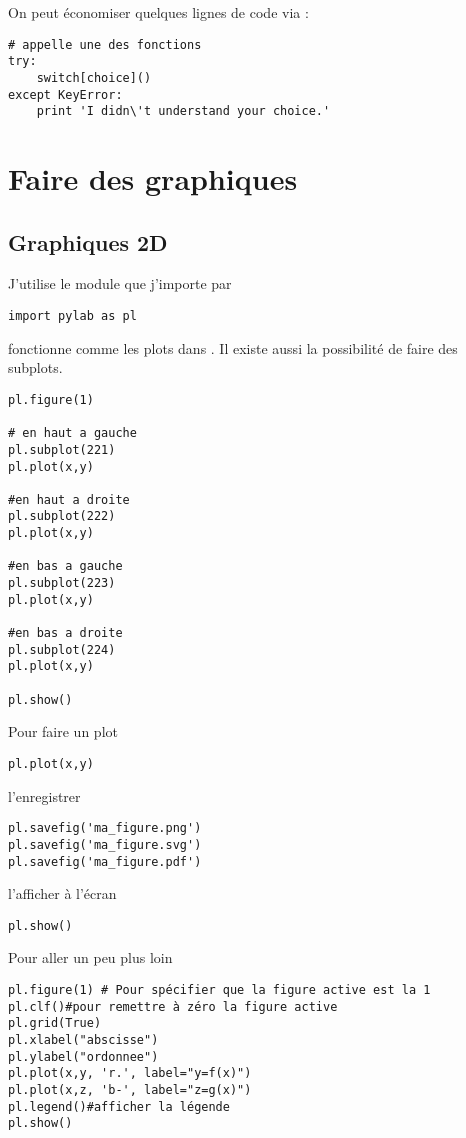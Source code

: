 \documentclass[a4paper,twoside]{article}
\begin{document}
On peut économiser quelques lignes de code via :
\begin{verbatim}
# appelle une des fonctions
try:
    switch[choice]()
except KeyError:
    print 'I didn\'t understand your choice.'
\end{verbatim}


\section{Faire des graphiques}
\subsection{Graphiques 2D}
J'utilise le module  que j'importe par
\begin{verbatim}
import pylab as pl
\end{verbatim}

\begin{remarque}
 fonctionne comme les plots dans . Il existe aussi la possibilité de faire des subplots.

\begin{verbatim}
pl.figure(1)

# en haut a gauche
pl.subplot(221)
pl.plot(x,y)

#en haut a droite
pl.subplot(222)
pl.plot(x,y)

#en bas a gauche
pl.subplot(223)
pl.plot(x,y)

#en bas a droite
pl.subplot(224)
pl.plot(x,y)

pl.show()
\end{verbatim}

\end{remarque}


Pour faire un plot
\begin{verbatim}
pl.plot(x,y)
\end{verbatim}
l'enregistrer
\begin{verbatim}
pl.savefig('ma_figure.png')
pl.savefig('ma_figure.svg')
pl.savefig('ma_figure.pdf')
\end{verbatim}
l'afficher à l'écran
\begin{verbatim}
pl.show()
\end{verbatim}

Pour aller un peu plus loin
\begin{verbatim}
pl.figure(1) # Pour spécifier que la figure active est la 1
pl.clf()#pour remettre à zéro la figure active
pl.grid(True)
pl.xlabel("abscisse")
pl.ylabel("ordonnee")
pl.plot(x,y, 'r.', label="y=f(x)")
pl.plot(x,z, 'b-', label="z=g(x)")
pl.legend()#afficher la légende
pl.show()
\end{verbatim}
\end{document}
